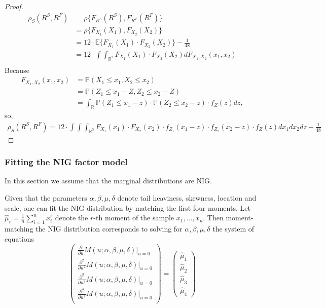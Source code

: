 \begin{proof}
  \begin{align}
  \rho_S(R^S, R^F) &= \rho\{F_{R^S}(R^S), F_{R^F}(R^F)\} \\
    &= \rho\{F_{X_1}(X_1), F_{X_2}(X_2)\} \\
    &= 12 \cdot \mathbb{E}\{F_{X_1}(X_1) \cdot F_{X_2}(X_2) \} - \frac{1}{48}\\
    &= 12 \cdot \int \int_{\mathbb{R}^2} F_{X_1}(X_1) \cdot F_{X_2}(X_2) dF_{X_1,X_2}(x_1,x_2)\\
    \end{align}
  Because
  \begin{align}
    F_{X_1,X_2}(x_1,x_2) &= \mathbb{P}(X_1 \leq x_1, X_2 \leq x_2)\\
    &= \mathbb{P}(Z_1 \leq x_1 - Z, Z_2 \leq x_2 - Z) \\
    &= \int_\mathbb{R}\mathbb{P}(Z_1 \leq x_1 - z) \cdot \mathbb{P}(Z_2 \leq x_2 - z) \cdot f_Z(z) dz,
    \end{align}
  so,
  \begin{align}
    \rho_S(R^S, R^F) = 12 \cdot \int \int \int_{\mathbb{R}^3} F_{X_1}(x_1) \cdot F_{X_2}(x_2) \cdot f_{Z_1}(x_1 -z) \cdot f_{Z_2}(x_2 -z) \cdot f_{Z}(z) dx_1 dx_2 dz -\frac{1}{48}
    \end{align}
  \end{proof}

\subsubsection{Fitting the NIG factor model}
\label{sec:fitt-nig-distr}

In this section we assume that the marginal distributions are NIG. 

Given that the parameters $\alpha, \beta, \mu, \delta$ denote tail
heaviness, skewness, location and scale, one can fit the NIG
distribution by matching the first four moments. Let
$\hat\mu_r=\frac{1}{n} \sum_{i=1}^n x_i^r$ denote the $r$-th moment of
the sample $x_1, \ldots, x_n$. Then moment-matching the NIG
distribution corresponds to solving for $\alpha, \beta, \mu, \delta$
the system of equations
\begin{equation*}
  \begin{pmatrix}
    \frac{\partial}{\partial u} M(u; \alpha, \beta, \mu,
    \delta)|_{u=0}\\[5pt]
    \frac{\partial^2}{\partial u^2} M(u; \alpha, \beta, \mu,
    \delta)|_{u=0}\\[5pt]
    \frac{\partial^3}{\partial u^3} M(u; \alpha, \beta, \mu,
    \delta)|_{u=0}\\[5pt]
    \frac{\partial^4}{\partial u^4} M(u; \alpha, \beta, \mu,
    \delta)|_{u=0}\\
  \end{pmatrix}
  =
  \begin{pmatrix}
    \hat\mu_1\\[5pt]
    \hat\mu_2\\[5pt]
    \hat\mu_3\\[5pt]
    \hat\mu_4
  \end{pmatrix}
\end{equation*}


